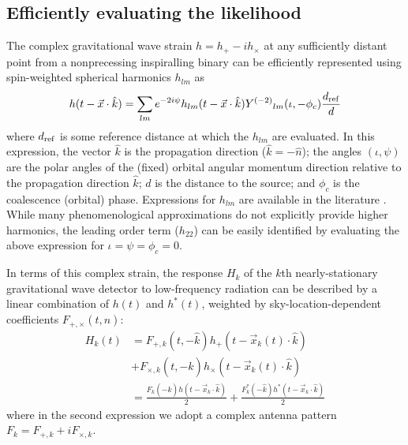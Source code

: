 \documentclass[twocolumn,prd,nofootinbib]{revtex4}
\newcommand\Y[1]{Y^{(#1)}{}}
\begin{document}
\subsection{Efficiently evaluating the likelihood}

The complex gravitational wave strain $h=h_+-ih_\times $ at any sufficiently distant point from a nonprecessing
inspiralling binary can be efficiently represented using spin-weighted spherical harmonics $h_{lm}$ as
\begin{align}
\label{eq:h:Expansion}
h(t-\vec{x}\cdot \hat{k}) = \sum_{lm} e^{-2i\psi} h_{lm}(t-\vec{x}\cdot \hat{k})  \Y{-2}_{lm}(\iota,-\phi_c)  \frac{d_{\rm ref}}{d}
\end{align}
where $d_{\rm ref}$ is some reference distance at which the $h_{lm}$ are evaluated.  
In this expression, the vector $\hat{k}$ is the propagation direction ($\hat{k}=-\hat{n}$); the angles $(\iota,\psi)$ are the polar angles of the (fixed) orbital angular momentum direction
relative to the propagation direction $\hat{k}$; $d$ is the distance to the source; and $\phi_c$ is the coalescence
(orbital) phase. 
Expressions for $h_{lm}$ are available in the literature 
\cite{gwastro-pn-MultipoleMomentsNonspinning, gw-astro-mergers-approximations-SpinningPNHigherHarmonics}.  While many
phenomenological approximations do not explicitly provide higher harmonics, the leading order term ($h_{22}$) can be
easily  identified by evaluating the above expression  for $\iota=\psi=\phi_c=0$.
  
%
In terms of this complex strain, the response $H_k$ of the $k$th  nearly-stationary gravitational wave detector to low-frequency radiation can
be described by a linear combination of $h(t)$ and $h^*(t)$, weighted by sky-location-dependent coefficients $F_{+,\times}(t,\hat{n})$:
\begin{align}
H_k(t) &=F_{+,k}(t,-\hat{k}) h_+(t-\vec{x}_k(t)\cdot \hat{k}) \nonumber \\
 & + F_{\times,k}(t,-\hat{k}) h_\times(t-\vec{x}_k(t)\cdot \hat{k}) \nonumber \\
 &=  \frac{F_k(-\hat{k}) h(t-\vec{x}_k\cdot \hat{k}) }{2} + \frac{F_k^*(-\hat{k})h^*(t-\vec{x}_k\cdot \hat{k})}{2}
\label{eq:Hh}
\end{align}
where in the second expression we adopt a complex antenna pattern $F_k=F_{+,k}+i F_{\times,k}$.  
\end{document}

